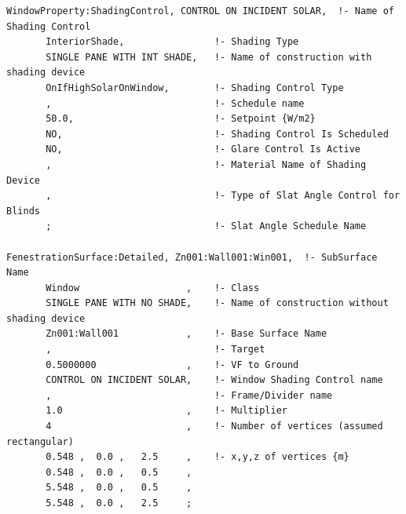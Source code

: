 \begin{lstlisting}
WindowProperty:ShadingControl, CONTROL ON INCIDENT SOLAR,  !- Name of Shading Control
       InteriorShade,                !- Shading Type
       SINGLE PANE WITH INT SHADE,   !- Name of construction with shading device
       OnIfHighSolarOnWindow,        !- Shading Control Type
       ,                             !- Schedule name
       50.0,                         !- Setpoint {W/m2}
       NO,                           !- Shading Control Is Scheduled
       NO,                           !- Glare Control Is Active
       ,                             !- Material Name of Shading Device
       ,                             !- Type of Slat Angle Control for Blinds
       ;                             !- Slat Angle Schedule Name

FenestrationSurface:Detailed, Zn001:Wall001:Win001,  !- SubSurface Name
       Window                   ,    !- Class
       SINGLE PANE WITH NO SHADE,    !- Name of construction without shading device
       Zn001:Wall001            ,    !- Base Surface Name
       ,                             !- Target
       0.5000000                ,    !- VF to Ground
       CONTROL ON INCIDENT SOLAR,    !- Window Shading Control name
       ,                             !- Frame/Divider name
       1.0                      ,    !- Multiplier
       4                        ,    !- Number of vertices (assumed rectangular)
       0.548 ,  0.0 ,   2.5     ,    !- x,y,z of vertices {m}
       0.548 ,  0.0 ,   0.5     ,
       5.548 ,  0.0 ,   0.5     ,
       5.548 ,  0.0 ,   2.5     ;
\end{lstlisting}

